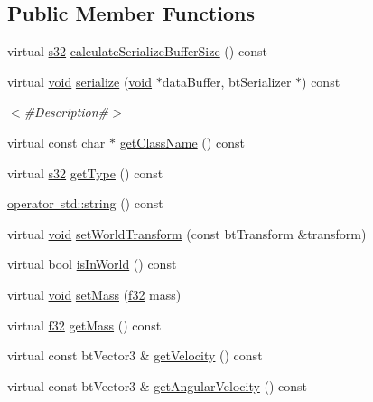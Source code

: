\subsection*{Public Member Functions}
\begin{DoxyCompactItemize}
\item 
virtual \mbox{\hyperlink{_util_8h_aa62c75d314a0d1f37f79c4b73b2292e2}{s32}} \mbox{\hyperlink{classnjli_1_1_physics_body_soft_ae2588284d8f625c70e93ed293bb9cb0b}{calculate\+Serialize\+Buffer\+Size}} () const
\item 
virtual \mbox{\hyperlink{_thread_8h_af1e856da2e658414cb2456cb6f7ebc66}{void}} \mbox{\hyperlink{classnjli_1_1_physics_body_soft_a7e38c5df16551787c35fc55c1335ddf1}{serialize}} (\mbox{\hyperlink{_thread_8h_af1e856da2e658414cb2456cb6f7ebc66}{void}} $\ast$data\+Buffer, bt\+Serializer $\ast$) const
\begin{DoxyCompactList}\small\item\em $<$\#\+Description\#$>$ \end{DoxyCompactList}\item 
virtual const char $\ast$ \mbox{\hyperlink{classnjli_1_1_physics_body_soft_a1d3ad459c9527251dfdef541ae44c850}{get\+Class\+Name}} () const
\item 
virtual \mbox{\hyperlink{_util_8h_aa62c75d314a0d1f37f79c4b73b2292e2}{s32}} \mbox{\hyperlink{classnjli_1_1_physics_body_soft_adfe628fd5ab43df08332362414d72b2a}{get\+Type}} () const
\item 
\mbox{\hyperlink{classnjli_1_1_physics_body_soft_a59efe6d63a15ad3ea002c3f0dbfc3fbd}{operator std\+::string}} () const
\item 
virtual \mbox{\hyperlink{_thread_8h_af1e856da2e658414cb2456cb6f7ebc66}{void}} \mbox{\hyperlink{classnjli_1_1_physics_body_soft_a500a0a1f0e9d729bd0ac23da18202af4}{set\+World\+Transform}} (const bt\+Transform \&transform)
\item 
virtual bool \mbox{\hyperlink{classnjli_1_1_physics_body_soft_a22d6c5a0a3572feb0a8888e54b2c0e9a}{is\+In\+World}} () const
\item 
virtual \mbox{\hyperlink{_thread_8h_af1e856da2e658414cb2456cb6f7ebc66}{void}} \mbox{\hyperlink{classnjli_1_1_physics_body_soft_a23766e4c1a649a93680f37592cd56060}{set\+Mass}} (\mbox{\hyperlink{_util_8h_a5f6906312a689f27d70e9d086649d3fd}{f32}} mass)
\item 
virtual \mbox{\hyperlink{_util_8h_a5f6906312a689f27d70e9d086649d3fd}{f32}} \mbox{\hyperlink{classnjli_1_1_physics_body_soft_af288891787749f41ddd0097ded18e413}{get\+Mass}} () const
\item 
virtual const bt\+Vector3 \& \mbox{\hyperlink{classnjli_1_1_physics_body_soft_af8cbddbeb15e03ebdf1e6000d7abb6a4}{get\+Velocity}} () const
\item 
virtual const bt\+Vector3 \& \mbox{\hyperlink{classnjli_1_1_physics_body_soft_abda1dce34eaaf0e2524d2f6afde1c502}{get\+Angular\+Velocity}} () const
\end{DoxyCompactItemize}
